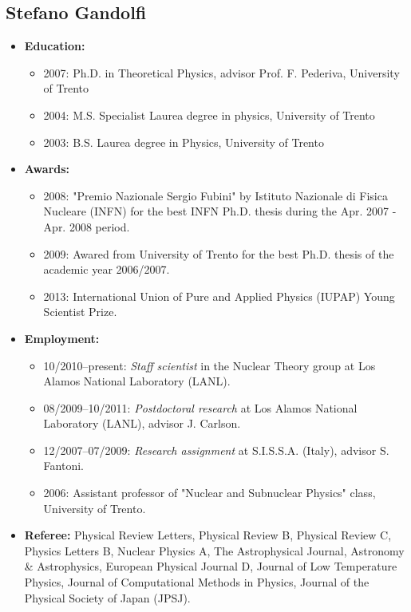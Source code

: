 \documentclass[11pt]{article}
\begin{document}
\subsection*{Stefano Gandolfi}

\begin{itemize}

\item{\bf Education:}
\begin{itemize}
\item 2007: Ph.D. in Theoretical Physics, advisor Prof. F. Pederiva, University of Trento
\item 2004: M.S. Specialist Laurea degree in physics, University of Trento
\item 2003: B.S. Laurea degree in Physics, University of Trento
\end{itemize}

\item{\bf Awards:}
\begin{itemize}
\item 2008: "Premio Nazionale Sergio Fubini" by Istituto Nazionale di Fisica Nucleare (INFN) for 
the best INFN Ph.D. thesis during the Apr. 2007 - Apr. 2008 period.
\item 2009: Awared from University of Trento for the best Ph.D. thesis of the academic year 2006/2007.
\item 2013: International Union of Pure and Applied Physics (IUPAP) Young Scientist Prize.
\end{itemize}

\item{\bf Employment:}
\begin{itemize}
\item 10/2010--present: \emph{Staff scientist} in the Nuclear Theory group at Los Alamos National Laboratory (LANL).
\item 08/2009--10/2011: \emph{Postdoctoral research} at Los Alamos National Laboratory (LANL), advisor J. Carlson.
\item 12/2007--07/2009: \emph{Research assignment} at S.I.S.S.A. (Italy), advisor S. Fantoni.
\item 2006: Assistant professor of "Nuclear and Subnuclear Physics" class, University of Trento.
\end{itemize}

\item{\bf Referee:} Physical Review Letters, Physical Review B, Physical Review C, Physics Letters B,
Nuclear Physics A, The Astrophysical Journal, Astronomy \& Astrophysics, European Physical Journal D,
Journal of Low Temperature Physics, Journal of Computational Methods in Physics, 
Journal of the Physical Society of Japan (JPSJ).


\end{itemize}
\end{document}
